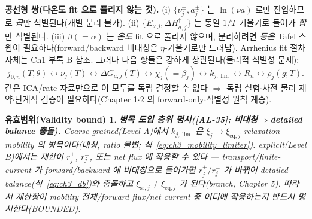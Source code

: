 \documentclass[11pt,a4paper]{article}
\newtheorem*{boundbox}{유효범위(Validity bound)}
\newcommand{\eq}{\mathrm{eq}}
\newcommand{\sstat}{\mathrm{ss}}
\newcommand{\AL}[1]{\textsf{[AL-#1]}}
\begin{document}
\textbf{공선형 쌍(다온도 fit 으로 풀리지 않는 것).} (i) $\{\nu_j^\pm,a_j^\pm\}$ 는 $\ln(\nu a)$ 로만 진입하므로
\emph{곱}만 식별된다(개별 분리 불가). (ii) $\{E_{\nu,j},\Delta H_{a,j}^\ddagger\}$ 는 동일 $1/T$ 기울기로
들어가 \emph{합}만 식별된다. (iii) $\beta(=\alpha)$ 는 \emph{온도} fit 으로 풀리지 않으며, 분리하려면 \emph{등온}
Tafel 스윕이 필요하다(forward/backward 비대칭은 $\eta$-기울기로만 드러남). Arrhenius fit 절차 자체는 Ch1 부록 B
참조. 그러나 다음 항들은 강하게 상관된다(물리적 식별성 문제):
\begin{equation}
j_{0,n}(T,\theta)\leftrightarrow\nu_j(T)\leftrightarrow\Delta G_{a,j}(T)\leftrightarrow\chi_j(=\beta_j)\leftrightarrow k_{j,\lim}\leftrightarrow R_n\leftrightarrow\rho_j(g;T).
\label{eq:ch3_ident_chain}
\end{equation}
같은 ICA/rate 자료만으로 이 모두를 독립 결정할 수 없다 $\Rightarrow$ 독립 실험$\cdot$사전 물리 제약$\cdot$단계적
검증이 필요하다(Chapter 1$\cdot$2 의 forward-only$\cdot$식별성 원칙 계승).
\begin{boundbox}
\textbf{병목 도입 층위 명시(\AL{35}; 비대칭$\Rightarrow$detailed balance 충돌).} Coarse-grained(Level A)에서
$k_{j,\lim}$ 은 $\xi_j\to\xi_{\eq,j}$ relaxation mobility 의 병목이다(대칭, ratio 불변; 식~\eqref{eq:ch3_mobility_limiter}).
explicit(Level B)에서는
제한이 $r_j^+$, $r_j^-$, 또는 net flux 에 작용할 수 있다 — transport/finite-current 가 forward/backward 에
\emph{비대칭}으로 들어가면 $r_j^+/r_j^-$ 가 바뀌어 detailed balance(식~\eqref{eq:ch3_db})와 충돌하고
$\xi_{\sstat,j}\ne\xi_{\eq,j}$ 가 된다(branch, Chapter 5). 따라서 제한항이 mobility 전체/forward flux/net current
중 \emph{어디}에 작용하는지 반드시 명시한다(BOUNDED).
\end{boundbox}

\end{document}
